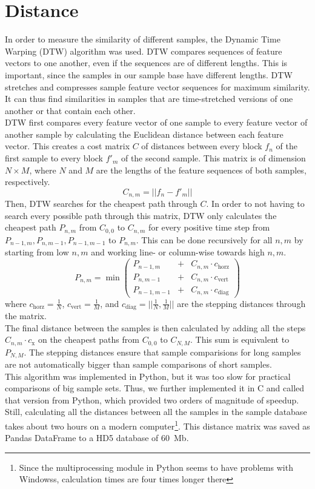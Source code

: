 \section{Distance}
\label{sec:Distance}
In order to measure the similarity of different samples, the Dynamic Time Warping (DTW) algorithm was used. DTW compares sequences of feature vectors to one another, even if the sequences are of different lengths. This is important, since the samples in our sample base have different lengths. DTW stretches and compresses sample feature vector sequences for maximum similarity. It can thus find similarities in samples that are time-stretched versions of one another or that contain each other.\\
DTW first compares every feature vector of one sample to every feature vector of another sample by calculating the Euclidean distance between each feature vector. This creates a cost matrix $C$ of distances between every block $f_n$ of the first sample to every block $f'_m$ of the second sample. This matrix is of dimension $N \times M$, where $N$ and $M$ are the lengths of the feature sequences of both samples, respectively.\\
\[
    C_{n,m} = ||f_n - f'_m||
\]
Then, DTW searches for the cheapest path through $C$. In order to not having to search every possible path through this matrix, DTW only calculates the cheapest path $P_{n,m}$ from $C_{0,0}$ to $C_{n,m}$ for every positive time step from $P_{n-1,m}, P_{n,m-1}, P_{n-1,m-1}$ to $P_{n,m}$. This can be done recursively for all $n,m$ by starting from low $n,m$ and working line- or column-wise towards high $n,m$.\\
\[
    P_{n,m} = \min \left(
    \begin{array}{rll}
      P_{n-1,m}   &+ &C_{n,m} \cdot c_\text{horz}\\
      P_{n,m-1}   &+ &C_{n,m} \cdot c_\text{vert}\\
      P_{n-1,m-1} &+ &C_{n,m} \cdot c_\text{diag}
    \end{array}
    \right)
\]
where $c_\text{horz} = \frac{1}{N}$, $c_\text{vert} = \frac{1}{M}$, and $c_\text{diag} = ||\frac{1}{N},\frac{1}{M}||$ are the stepping distances through the matrix.\\
The final distance between the samples is then calculated by adding all the steps $C_{n,m} \cdot c_\text{x}$ on the cheapest paths from $C_{0,0}$ to $C_{N,M}$. This sum is equivalent to $P_{N,M}$. The stepping distances ensure that sample comparisions for long samples are not automatically bigger than sample comparisons of short samples.\\
This algorithm was implemented in Python, but it was too slow for practical comparisons of big sample sets. Thus, we further implemented it in C and called that version from Python, which provided two orders of magnitude of speedup. Still, calculating all the distances between all the samples in the sample database takes about two hours on a modern computer\footnote{Since the multiprocessing module in Python seems to have problems with Windowss, calculation times are four times longer there}. This distance matrix was saved as Pandas DataFrame to a HD5 database of 60~Mb.